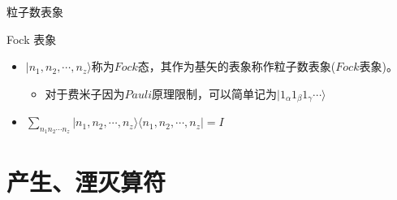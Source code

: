 \documentclass{beamer}
\begin{document}
	\begin{frame}{粒子数表象}
		\begin{block}{Fock 表象}
			\begin{itemize}
				\item $|n_{1},n_{2},\cdots,n_{z}\rangle$称为$Fock$态，其作为基矢的表象称作粒子数表象($Fock$表象)。
				\begin{itemize}
					\item 对于费米子因为$Pauli$原理限制，可以简单记为$|1_{\alpha} 1_{\beta} 1_{\gamma}\cdots\rangle$
				\end{itemize}
				\item $\sum\limits_{n_{1}n_{2}\cdots n_{z}}|n_{1},n_{2},\cdots,n_{z}\rangle\langle n_{1},n_{2},\cdots,n_{z}|=I$
			\end{itemize}
		\end{block}
	\end{frame}	
    \section{产生、湮灭算符}
\end{document}
